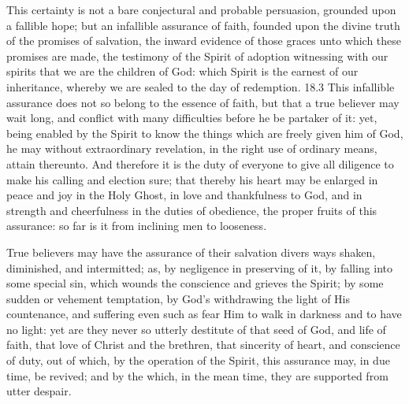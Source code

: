 \begin{outerlst}[left=0pt,labelsep=0pt]
\begin{innerlst}[resume*]
\item This certainty is not a bare conjectural and probable persuasion, grounded upon a fallible hope; but an infallible assurance of faith, founded upon the divine truth of the promises of salvation, the inward evidence of those graces unto which these promises are made, the testimony of the Spirit of adoption witnessing with our spirits that we are the children of God: which Spirit is the earnest of our inheritance, whereby we are sealed to the day of redemption.  18.3 This infallible assurance does not so belong to the essence of faith, but that a true believer may wait long, and conflict with many difficulties before he be partaker of it: yet, being enabled by the Spirit to know the things which are freely given him of God, he may without extraordinary revelation, in the right use of ordinary means, attain thereunto. And therefore it is the duty of everyone to give all diligence to make his calling and election sure; that thereby his heart may be enlarged in peace and joy in the Holy Ghost, in love and thankfulness to God, and in strength and cheerfulness in the duties of obedience, the proper fruits of this assurance: so far is it from inclining men to looseness.   

\item True believers may have the assurance of their salvation divers ways shaken, diminished, and intermitted; as, by negligence in preserving of it, by falling into some special sin, which wounds the conscience and grieves the Spirit; by some sudden or vehement temptation, by God's withdrawing the light of His countenance, and suffering even such as fear Him to walk in darkness and to have no light: yet are they never so utterly destitute of that seed of God, and life of faith, that love of Christ and the brethren, that sincerity of heart, and conscience of duty, out of which, by the operation of the Spirit, this assurance may, in due time, be revived; and by the which, in the mean time, they are supported from utter despair.  
\end{innerlst}


\end{outerlst}

